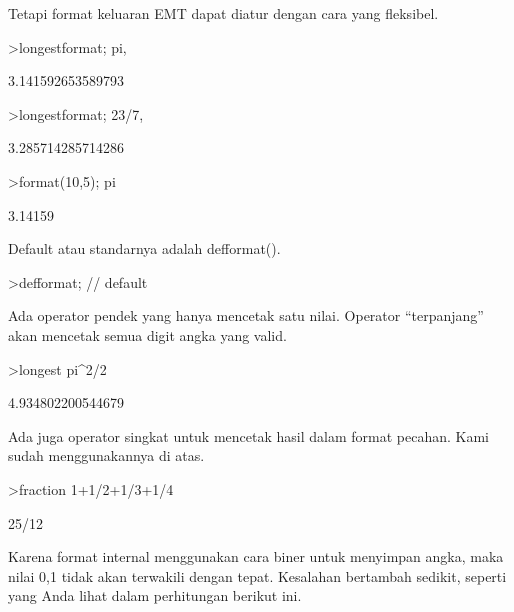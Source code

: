 \documentclass[a4paper,10pt]{article}
\begin{document}
\begin{eulernotebook}
\begin{eulercomment}
Tetapi format keluaran EMT dapat diatur dengan cara yang fleksibel.
\end{eulercomment}
\begin{eulerprompt}
>longestformat; pi,
\end{eulerprompt}
\begin{euleroutput}
  3.141592653589793
\end{euleroutput}
\begin{eulerprompt}
>longestformat; 23/7,
\end{eulerprompt}
\begin{euleroutput}
  3.285714285714286
\end{euleroutput}
\begin{eulerprompt}
>format(10,5); pi
\end{eulerprompt}
\begin{euleroutput}
    3.14159 
\end{euleroutput}
\begin{eulercomment}
Default atau standarnya adalah defformat().
\end{eulercomment}
\begin{eulerprompt}
>defformat; // default
\end{eulerprompt}
\begin{eulercomment}
Ada operator pendek yang hanya mencetak satu nilai. Operator
“terpanjang” akan mencetak semua digit angka yang valid.
\end{eulercomment}
\begin{eulerprompt}
>longest pi^2/2
\end{eulerprompt}
\begin{euleroutput}
        4.934802200544679 
\end{euleroutput}
\begin{eulercomment}
Ada juga operator singkat untuk mencetak hasil dalam format pecahan.
Kami sudah menggunakannya di atas.
\end{eulercomment}
\begin{eulerprompt}
>fraction 1+1/2+1/3+1/4
\end{eulerprompt}
\begin{euleroutput}
  25/12
\end{euleroutput}
\begin{eulercomment}
Karena format internal menggunakan cara biner untuk menyimpan angka,
maka nilai 0,1 tidak akan terwakili dengan tepat. Kesalahan bertambah
sedikit, seperti yang Anda lihat dalam perhitungan berikut ini.
\end{eulercomment}
\begin{eulerprompt}

\end{eulerprompt}
\end{eulernotebook}
\end{document}
